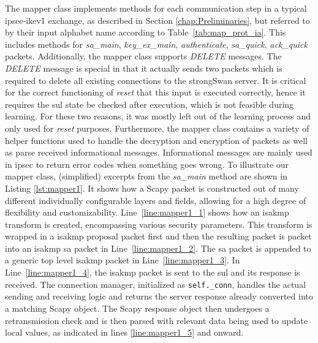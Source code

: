 The mapper class implements methods for each communication step in a typical \ac{ipsec}-\ac{ike}v1 exchange, as described in Section \ref{chap:Preliminaries}, but referred to by their input alphabet name according to Table~\ref{tab:map_prot_ia}. This includes methods for \emph{sa\_main}, \emph{key\_ex\_main}, \emph{authenticate}, \emph{sa\_quick}, \emph{ack\_quick} packets. Additionally, the mapper class supports \emph{DELETE} messages. The \emph{DELETE} message is special in that it actually sends two packets which is required to delete all existing connections to the strongSwan server. It is critical for the correct functioning of \emph{reset} that this input is executed correctly, hence it requires the \ac{sul} state be checked after execution, which is not feasible during learning. For these two reasons, it was mostly left out of the learning process and only used for \emph{reset} purposes. Furthermore, the mapper class contains a variety of helper functions used to handle the decryption and encryption of packets as well as parse received informational messages. Informational messages are mainly used in \ac{ipsec} to return error codes when something goes wrong. To illustrate our mapper class, (simplified) excerpts from the \emph{sa\_main} method are shown in Listing \ref{lst:mapper1}. It shows how a Scapy packet is constructed out of many different individually configurable layers and fields, allowing for a high degree of flexibility and customizability. Line~\ref{line:mapper1_1} shows how an \ac{isakmp} transform is created, encompassing various security parameters. This transform is wrapped in a \ac{isakmp} proposal packet first and then the resulting packet is packet into an \ac{isakmp} \ac{sa} packet in Line~\ref{line:mapper1_2}. The \ac{sa} packet is appended to a generic top level \ac{isakmp} packet in Line~\ref{line:mapper1_3}. In Line~\ref{line:mapper1_4}, the \ac{isakmp} packet is sent to the \ac{sul} and its response is received. The connection manager, initialized as \texttt{self.\_conn}, handles the actual sending and receiving logic and returns the server response already converted into a matching Scapy object. The Scapy response object then undergoes a retransmission check and is then parsed with relevant data being used to update local values, as indicated in lines \ref{line:mapper1_5} and onward.

